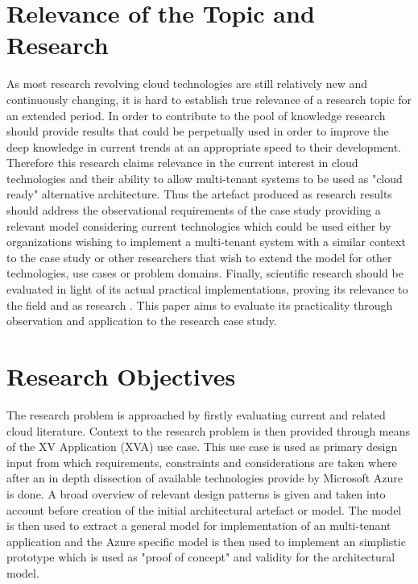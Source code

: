 \section{Relevance of the Topic and Research}

As most research revolving cloud technologies are still relatively new and continuously changing, it is hard to establish true relevance of a research topic for an extended period. In order to contribute to the pool of knowledge research should provide results that could be perpetually used in order to improve the deep knowledge in current trends at an appropriate speed to their development. Therefore this research claims relevance in the current interest in cloud technologies and their ability to allow multi-tenant systems to be used as "cloud ready" alternative architecture. Thus the artefact produced as research results should address the observational requirements of the case study providing a relevant model considering current technologies which could be used either by organizations wishing to implement a multi-tenant system with a similar context to the case study or other researchers that wish to extend the model for other technologies, use cases or problem domains. Finally, scientific research should be evaluated in light of its actual practical implementations, proving its relevance to the field and as research \cite{Hevner2004}. This paper aims to evaluate its practicality through observation and application to the research case study.


\section{Research Objectives}

The research problem is approached by firstly evaluating current and related cloud literature. Context to the research problem is then provided through means of the XV Application (XVA) use case. This use case is used as primary design input from which requirements, constraints and considerations are taken where after an in depth dissection of available technologies provide by Microsoft Azure is done. A broad overview of relevant design patterns is given and taken into account before creation of the initial architectural artefact or model. The model is then used to extract a general model for implementation of an multi-tenant application and the Azure specific model is then used to implement an simplistic prototype which is used as "proof of concept" and validity for the architectural model.

